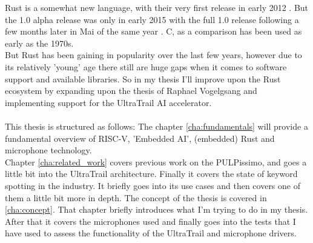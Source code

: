 

Rust \cite{rustlang} is a somewhat new language,
with their very first release in early 2012 \cite{rust_releases}.
But the 1.0 alpha release was only in early 2015 \cite{rust_releases}
with the full 1.0 release following a few months later in Mai of the same year \cite{rust_releases}.
C, as a comparison has been used as early as the 1970s.\\
But Rust has been gaining in popularity \cite{rust_popularity} over the last few years, however
due to its relatively 'young' age there still are huge gaps when it comes to software support and available libraries.
So in my thesis I'll improve upon the Rust ecosystem by expanding upon the thesis of Raphael Vogelgsang \cite{rust_pulp}
and implementing support for the UltraTrail \cite{ultratrail} AI accelerator.
\\\\
This thesis is structured as follows:
The chapter \ref{cha:fundamentals} will provide a fundamental overview of RISC-V, 'Embedded AI', (embedded) Rust and microphone technology.\\
Chapter \ref{cha:related_work} covers previous work on the PULPissimo, and goes a little bit into the UltraTrail architecture.
Finally it covers the state of keyword spotting in the industry.
It briefly goes into its use cases and then covers one of them a little bit more in depth.
The concept of the thesis is covered in \ref{cha:concept}.
That chapter briefly introduces what I'm trying to do in my thesis.
After that it covers the microphones used and finally goes into the tests that I have used
to assess the functionality of the UltraTrail and microphone drivers.


